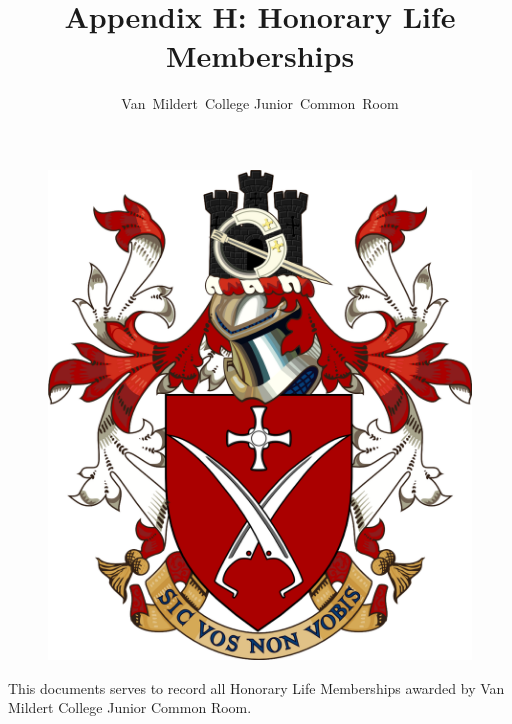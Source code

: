 \documentclass[12pt]{article}
\title{Appendix H: Honorary Life Memberships}
\author{Van~Mildert~College Junior~Common~Room}
\date{\thedate}
\begin{document}
\begin{titlepage}  %
    \maketitle
    \begin{figure}[h]
        \includegraphics[scale=0.25]{arms.png}  %
        \centering
    \end{figure}
    \thispagestyle{empty}
\end{titlepage}
\setcounter{page}{2}  %

This documents serves to record all Honorary Life Memberships awarded by Van Mildert College Junior Common Room.
\end{document}
